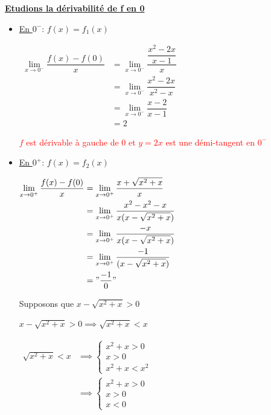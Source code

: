 \documentclass[12pt,a4paper]{article}
\begin{document}
\begin{enumerate}
\underline{\textbf{Etudions la dérivabilité de f en 0  } } 

\begin{itemize}
\item \underline{En $0^-$}: $f(x)=f_{1}(x)$ 

\(
\begin{aligned}
 \lim\limits_{x \to 0^-} \dfrac{f(x)-f(0)}{x} &= \lim\limits_{x \to 0^-} \dfrac{\dfrac{x^2-2x}{x-1}}{x}\\
 															                &= \lim\limits_{x \to 0^-} \dfrac{x^2-2x}{x^2-x}\\
 															                &= \lim\limits_{x \to 0^-} \dfrac{x-2}{x-1}\\
 															                &=2
\end{aligned}    
\)

\textcolor{red}{ $f$ est dérivable à gauche de $0$ et $y=2x$ est une démi-tangent en $0^-$ }

\item \underline{En $0^+$}: $f(x)=f_{2}(x)$ 

\(
\begin{aligned}
\lim\limits_{x \to 0^+} \dfrac{f(x)-f(0)}{x} &=\lim\limits_{x \to 0^+} \dfrac{x + \sqrt{x^2+x}}{x}\\
															               &=\lim\limits_{x \to 0^+} \dfrac{x^2-x^2-x}{x(x - \sqrt{x^2+x})}\\
															               &=\lim\limits_{x \to 0^+} \dfrac{-x}{x(x - \sqrt{x^2+x})}\\
															               &=\lim\limits_{x \to 0^+} \dfrac{-1}{(x - \sqrt{x^2+x})}\\
															               &="\dfrac{-1}{0}"\\
\end{aligned}    
\)

Supposons que $ x - \sqrt{x^2+x} > 0 $

$ x - \sqrt{x^2+x} > 0 \implies \sqrt{x^2+x} < x $

$
\begin{aligned}
\sqrt{x^2+x} < x &\implies \begin{cases}
										x^2+x > 0\\
										x > 0\\ 
										x^2+x < x^{2} 
										\end{cases}\\
									&\implies \begin{cases}
										x^2+x > 0\\
										x > 0\\ 
										x < 0
										\end{cases}\\
\end{aligned}
$


\end{itemize}
\end{enumerate}
\end{document}
